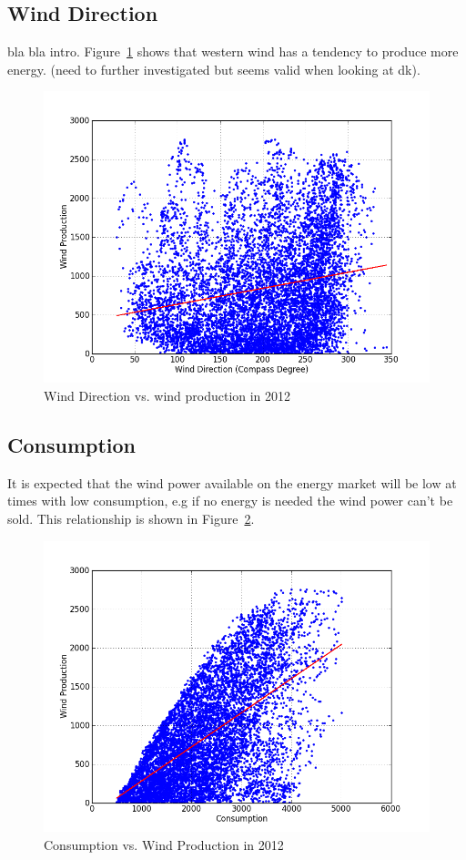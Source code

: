 \subsection{Wind Direction}
bla bla intro. Figure~\ref{fig:windDirVsProd} shows that western wind has a tendency to produce more energy. (need to further investigated but seems valid when looking at dk).
\begin{figure}[H]
\centering
\includegraphics[width=0.99\linewidth,natwidth=898,natheight=587]{billeder/productionVsWindDirection.png}
\caption{Wind Direction vs. wind production in 2012}
\label{fig:windDirVsProd}
\end{figure}

\subsection{Consumption}
It is expected that the wind power available on the energy market will be low at times with low consumption, e.g if no energy is needed the wind power can't be sold.  This relationship is shown in Figure~\ref{fig:consumptionVsWindProduction}.

\begin{figure}[H]
\centering
\includegraphics[width=0.99\linewidth,natwidth=898,natheight=587]{billeder/consumptionVsWindProduction.png}
\caption{Consumption vs. Wind Production in 2012}
\label{fig:consumptionVsWindProduction}
\end{figure}

